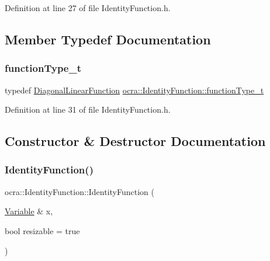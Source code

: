Definition at line 27 of file Identity\+Function.\+h.



\subsection{Member Typedef Documentation}
\hypertarget{classocra_1_1IdentityFunction_a4598384746d901d0a13b712666288894}{}\label{classocra_1_1IdentityFunction_a4598384746d901d0a13b712666288894} 
\subsubsection{\texorpdfstring{function\+Type\+\_\+t}{functionType\_t}}
{\footnotesize\ttfamily typedef \hyperlink{classocra_1_1DiagonalLinearFunction}{Diagonal\+Linear\+Function} \hyperlink{classocra_1_1IdentityFunction_a4598384746d901d0a13b712666288894}{ocra\+::\+Identity\+Function\+::function\+Type\+\_\+t}}



Definition at line 31 of file Identity\+Function.\+h.



\subsection{Constructor \& Destructor Documentation}
\hypertarget{classocra_1_1IdentityFunction_a65a20f4b0036a5a6ca7b0e92e34dc1b0}{}\label{classocra_1_1IdentityFunction_a65a20f4b0036a5a6ca7b0e92e34dc1b0} 
\subsubsection{\texorpdfstring{Identity\+Function()}{IdentityFunction()}}
{\footnotesize\ttfamily ocra\+::\+Identity\+Function\+::\+Identity\+Function (\begin{DoxyParamCaption}\item[{\hyperlink{classocra_1_1Variable}{Variable} \&}]{x,  }\item[{bool}]{resizable = {\ttfamily true} }\end{DoxyParamCaption})}

